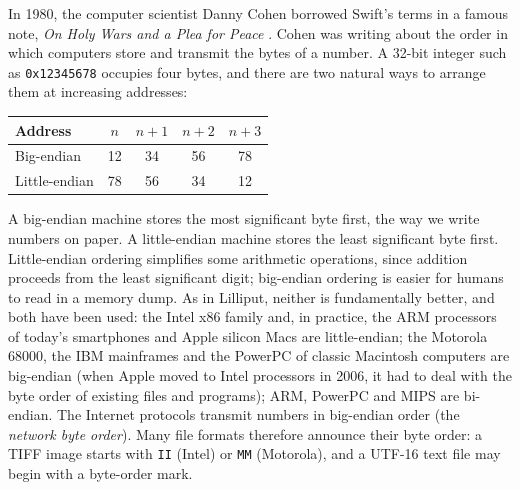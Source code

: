 In 1980, the computer scientist Danny Cohen borrowed Swift's terms in a famous note, \emph{On Holy Wars and a Plea for Peace} \cite{Cohen1981}. Cohen was writing about the order in which computers
store and transmit the bytes of a number. A 32-bit integer such as \texttt{0x12345678} occupies four bytes, and there are two natural ways to arrange them at increasing addresses:
\begin{center}
\begin{tabular}{@{}lcccc@{}}\toprule
Address & $n$ & $n+1$ & $n+2$ & $n+3$\\ \midrule
Big-endian & 12 & 34 & 56 & 78\\ Little-endian & 78 & 56 & 34 & 12\\ \bottomrule
\end{tabular}
\end{center}
A big-endian machine stores the most significant byte first, the way we write numbers on paper. A little-endian machine stores the least significant byte first. Little-endian ordering simplifies some
arithmetic operations, since addition proceeds from the least significant digit; big-endian ordering is easier for humans to read in a memory dump. As in Lilliput, neither is fundamentally better,
and both have been used: the Intel x86 family and, in practice, the ARM processors of today's smartphones and Apple silicon Macs are little-endian; the Motorola 68000, the IBM mainframes and the
PowerPC of classic Macintosh computers are big-endian (when Apple moved to Intel processors in 2006, it had to deal with the byte order of existing files and programs); ARM, PowerPC and MIPS are
bi-endian. The Internet protocols transmit numbers in big-endian order (the \emph{network byte order}). Many file formats therefore announce their byte order: a TIFF image starts with
\texttt{II} (Intel) or \texttt{MM} (Motorola), and a UTF-16 text file may begin with a byte-order mark.

